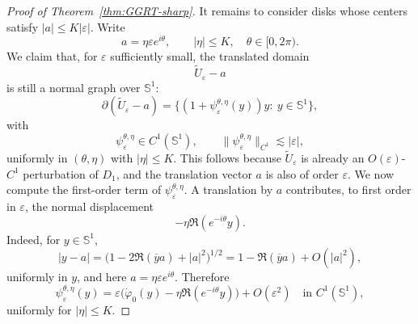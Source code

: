 \documentclass[a4paper,11pt,reqno]{amsart}
\numberwithin{equation}{section}
\theoremstyle{plain} %
\theoremstyle{definition} %
\theoremstyle{remark}
\begin{document}
\begin{proof}[Proof of Theorem~\ref{thm:GGRT-sharp}]
It remains to consider disks whose centers satisfy $|a|\leq K|\varepsilon|$.
Write
\[
a=\eta \varepsilon e^{i\theta},
\qquad
|\eta|\leq K,
\quad
\theta\in [0,2\pi).
\]
We claim that, for $\varepsilon$ sufficiently small, the translated domain
\[
\widetilde U_\varepsilon-a
\]
is still a normal graph over $\mathbb S^1$:
\[
\partial(\widetilde U_\varepsilon-a)
=
\{(1+\psi_\varepsilon^{\theta,\eta}(y))y:\ y\in \mathbb S^1\},
\]
with
\[
\psi_\varepsilon^{\theta,\eta}\in C^1(\mathbb S^1),
\qquad
\|\psi_\varepsilon^{\theta,\eta}\|_{C^1}\lesssim |\varepsilon|,
\]
uniformly in $(\theta,\eta)$ with $|\eta|\leq K$. This follows because
$\widetilde U_\varepsilon$ is already an $O(\varepsilon)$-$C^1$ perturbation of
$D_1$, and the translation vector $a$ is also of order $\varepsilon$. We now compute the first-order term of $\psi_\varepsilon^{\theta,\eta}$.
A translation by $a$ contributes, to first order in $\varepsilon$, the normal
displacement
\[
-\eta \Re(e^{-i\theta}y).
\]
Indeed, for \(y\in \mathbb S^1\),
\[
|y-a|
=
\bigl(1-2\Re(\overline y a)+|a|^2\bigr)^{1/2}
=
1-\Re(\overline y a)+O(|a|^2),
\]
uniformly in \(y\), and here \(a=\eta\varepsilon e^{i\theta}\).
Therefore
\begin{equation}\label{eq:psi-expansion-new}
\psi_\varepsilon^{\theta,\eta}(y)
=
\varepsilon\Big(\dot\varphi_0(y)-\eta \Re(e^{-i\theta}y)\Big)
+
O(\varepsilon^2)
\quad \text{in } C^1(\mathbb S^1),
\end{equation}
uniformly for $|\eta|\leq K$.


\end{proof}
\end{document}
